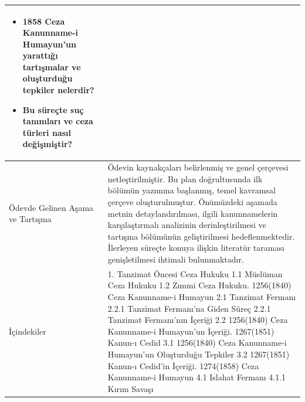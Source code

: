 \documentclass{assignment}
\begin{document}
\begin{longtable}{|p{}|p{}|}
\begin{itemize}
    \item 1858 Ceza Kanunname-i Humayun'un yarattığı tartışmalar ve oluşturduğu tepkiler nelerdir?
    \item Bu süreçte suç tanımları ve ceza türleri nasıl değişmiştir?
\end{itemize}
\\ 
\hline
Ödevde Gelinen Aşama ve Tartışma & 
Ödevin kaynakçaları belirlenmiş ve genel çerçevesi netleştirilmiştir. Bu plan doğrultusunda ilk bölümün yazımına başlanmış, temel kavramsal çerçeve oluşturulmuştur. Önümüzdeki aşamada metnin detaylandırılması, ilgili kanunnamelerin karşılaştırmalı analizinin derinleştirilmesi ve tartışma bölümünün geliştirilmesi hedeflenmektedir. İlerleyen süreçte konuya ilişkin literatür taraması genişletilmesi ihtimali bulunmaktadır.
\\
\hline
İçindekiler 
& 
1. Tanzimat Öncesi Ceza Hukuku\newline
\hspace*{1em} 1.1 Müslüman Ceza Hukuku\newline
\hspace*{1em} 1.2 Zımmi Ceza Hukuku\newline
2. 1256(1840) Ceza Kanunname-i Humayun\newline
\hspace*{1em} 2.1 Tanzimat Fermanı\newline
\hspace*{1em}\hspace*{1em} 2.2.1 Tanzimat Fermanı'na Giden Süreç\newline
\hspace*{1em}\hspace*{1em} 2.2.1 Tanzimat Fermanı'nın İçeriği\newline
\hspace*{1em} 2.2 1256(1840) Ceza Kanunname-i Humayun'un İçeriği\newline
3. 1267(1851) Kanun-ı Cedid\newline
\hspace*{1em} 3.1 1256(1840) Ceza Kanunname-i Humayun'un Oluşturduğu Tepkiler\newline
\hspace*{1em} 3.2 1267(1851) Kanun-ı Cedid'in İçeriği\newline
4. 1274(1858) Ceza Kanunname-i Humayun\newline
\hspace*{1em} 4.1 Islahat Fermanı\newline
\hspace*{1em}\hspace*{1em} 4.1.1 Kırım Savaşı\newline

\end{longtable}
\end{document}
